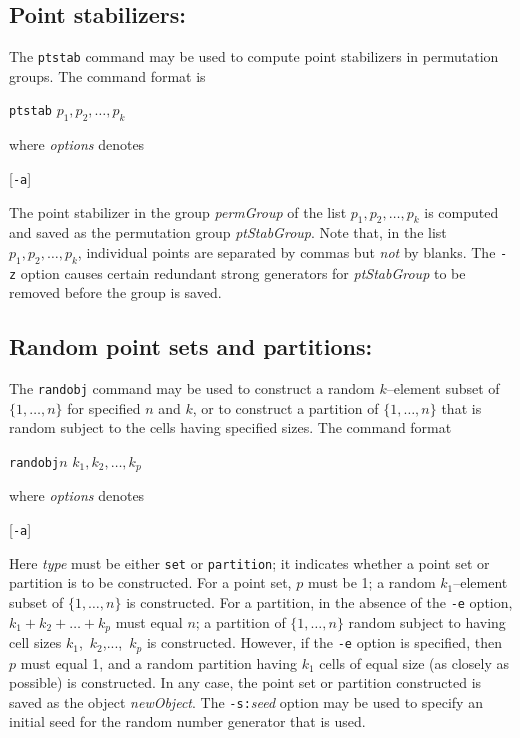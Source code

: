 \subsection{Point stabilizers:}The {\tt ptstab}
command may be used to compute point stabilizers in permutation groups.  The
command format is
%
\smallskip
\centerline{{\tt ptstab}\quad
            $p_1,p_2,\ldots,p_k$}
\smallskip
where {\it options\/} denotes
\smallskip
\centerline{
        [{\tt -a}]\enskip
        [{\tt -i}]\enskip
        [{\tt -mb:}$k$]\enskip
        [{\tt -mw:}$w$]\enskip
        [{\tt -n:}{\it name\/}]\enskip
        [{\tt -p:}{\it path\/}]\enskip
        [{\tt -q}]\enskip
        [{\tt -z}]}
\smallskip
The point stabilizer in the group {\it permGroup\/} of the list
$p_1,p_2,\ldots,p_k$ is computed and saved as the permutation group
{\it ptStabGroup}.  Note that, in the list $p_1,p_2,\ldots,p_k$, individual
points are separated by commas but {\it not\/} by blanks.
The {\tt -z} option causes certain redundant strong generators for {\it ptStabGroup}
to be removed before the group is saved.
%
%
%
%
\subsection{Random point sets and partitions:}The {\tt randobj} 
command may be used to construct a random $k$--element subset of 
$\{1,\ldots,n\}$ for specified $n$ and $k$, or to construct a partition
of $\{1,\ldots,n\}$ that is random subject to the cells having specified
sizes.  The command format
%
\smallskip
\centerline{{\tt randobj}\quad $n$\quad 
            $k_1,k_2,\ldots,k_p$}
\smallskip
where {\it options\/} denotes
\smallskip
\centerline{
        [{\tt -a}]\enskip
        [{\tt -e}]\enskip
        [{\tt -n:}{\it name\/}]\enskip
        [{\tt -s:}{\it seed\/}]}
\smallskip
Here {\it type\/} must be either {\tt set} or {\tt partition}; it indicates
whether a point set or partition is to be constructed.  For a point set,
$p$ must be 1; a random $k_1$--element subset of $\{1,\ldots,n\}$ is constructed.
For a partition, in the absence of the {\tt -e} option, 
$k_1 + k_2 + \ldots + k_p$ must equal $n$; a partition of $\{1,\ldots,n\}$
random subject to having cell sizes $k_1$,~$k_2$,...,~$k_p$ is constructed.
However, if the {\tt -e} option is specified, then $p$ must equal 1, and
a random partition having $k_1$ cells of equal size (as closely as possible)
is constructed.  In any case, the point set or partition constructed is saved
as the object {\it newObject}.
\medbreak
The {\tt -s:}{\it seed} option may be used to specify an initial seed for
the random number generator that is used.
%
%
